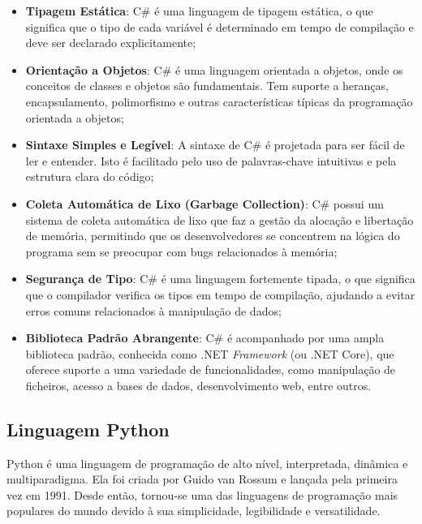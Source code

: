 \begin{itemize}
\item \textbf{Tipagem Estática}: C\# é uma linguagem de tipagem estática, o que 
significa que o tipo de cada variável é determinado em tempo de compilação e deve 
ser declarado explicitamente;

\item \textbf{Orientação a Objetos}: C\# é uma linguagem orientada a objetos, 
onde os conceitos de classes e objetos são fundamentais. Tem suporte a heranças, 
encapsulamento, polimorfismo e outras características típicas da programação 
orientada a objetos;

\item \textbf{Sintaxe Simples e Legível}: A sintaxe de C\# é projetada para 
ser fácil de ler e entender. Isto é facilitado pelo uso de palavras-chave intuitivas 
e pela estrutura clara do código;

\item \textbf{Coleta Automática de Lixo (Garbage Collection)}: C\# possui um sistema 
de coleta automática de lixo que faz a gestão da alocação e libertação de memória, 
permitindo que os desenvolvedores se concentrem na lógica do programa sem se preocupar
com bugs relacionados à memória;

\item \textbf{Segurança de Tipo}: C\# é uma linguagem fortemente tipada, o que 
significa que o compilador verifica os tipos em tempo de compilação, ajudando a evitar 
erros comuns relacionados à manipulação de dados;


\item \textbf{Biblioteca Padrão Abrangente}: C\# é acompanhado por uma ampla 
biblioteca padrão, conhecida como .NET \textit{Framework} (ou .NET Core), que oferece
suporte a uma variedade de funcionalidades, como manipulação de ficheiros, acesso a bases 
de dados, desenvolvimento web, entre outros.
\end{itemize}



\subsection{Linguagem Python}


Python é uma linguagem de programação de alto nível, interpretada, dinâmica e 
multiparadigma. Ela foi criada por Guido van Rossum e lançada pela primeira vez em 1991.
Desde então, tornou-se uma das linguagens de programação mais populares do mundo devido
à sua simplicidade, legibilidade e versatilidade.

